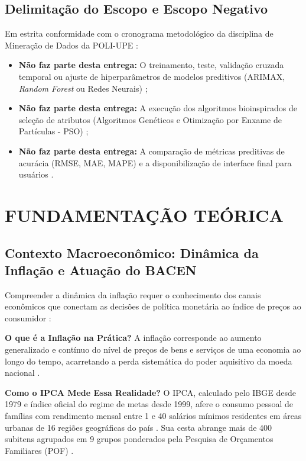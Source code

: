 \documentclass[10pt,twoside]{article}
\begin{document}
\subsection{Delimitação do Escopo e Escopo Negativo}
Em estrita conformidade com o cronograma metodológico da disciplina de Mineração de Dados da POLI-UPE \cite{ref7, ref15}:
\begin{itemize}[leftmargin=1.5em]
    \item \textbf{Não faz parte desta entrega:} O treinamento, teste, validação cruzada temporal ou ajuste de hiperparâmetros de modelos preditivos (ARIMAX, \textit{Random Forest} ou Redes Neurais) \cite{ref1, ref14, ref18};
    \item \textbf{Não faz parte desta entrega:} A execução dos algoritmos bioinspirados de seleção de atributos (Algoritmos Genéticos e Otimização por Enxame de Partículas - PSO) \cite{ref8, ref11};
    \item \textbf{Não faz parte desta entrega:} A comparação de métricas preditivas de acurácia (RMSE, MAE, MAPE) e a disponibilização de interface final para usuários \cite{ref6, ref15}.
\end{itemize}

\section{FUNDAMENTAÇÃO TEÓRICA}

\subsection{Contexto Macroeconômico: Dinâmica da Inflação e Atuação do BACEN}
Compreender a dinâmica da inflação requer o conhecimento dos canais econômicos que conectam as decisões de política monetária ao índice de preços ao consumidor \cite{ref4, ref13}:

\textbf{O que é a Inflação na Prática?} A inflação corresponde ao aumento generalizado e contínuo do nível de preços de bens e serviços de uma economia ao longo do tempo, acarretando a perda sistemática do poder aquisitivo da moeda nacional \cite{ref4, ref13}.

\textbf{Como o IPCA Mede Essa Realidade?} O IPCA, calculado pelo IBGE desde 1979 e índice oficial do regime de metas desde 1999, afere o consumo pessoal de famílias com rendimento mensal entre 1 e 40 salários mínimos residentes em áreas urbanas de 16 regiões geográficas do país \cite{ref10}. Sua cesta abrange mais de 400 subitens agrupados em 9 grupos ponderados pela Pesquisa de Orçamentos Familiares (POF) \cite{ref10}.
\end{document}
